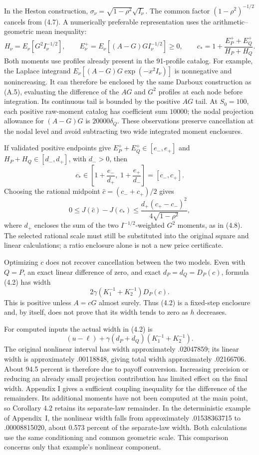 In the Heston construction, \(\sigma_\nu=\sqrt{1-\rho^2}\sqrt{I_\nu}\).
The common factor \((1-\rho^2)^{-1/2}\) cancels from (4.7). A numerically
preferable representation uses the arithmetic--geometric mean inequality:
\[
H_\nu=E_\nu[G^2I_\nu^{-1/2}],\qquad
E_\nu^+=E_\nu[(A-G)GI_\nu^{-1/2}]\ge0,
\qquad
c_* =1+\frac{E_P^++E_Q^+}{H_P+H_Q}.             \tag{4.8}
\]
Both moments use profiles already present in the 91-profile catalog.
For example, the Laplace integrand
\(E_\nu[(A-G)G\exp(-x^2I_\nu)]\) is nonnegative and nonincreasing.
It can therefore be enclosed by the same Darboux construction as (A.5),
evaluating the difference of the \(AG\) and \(G^2\) profiles at each
node before integration. Its continuous tail is bounded by the positive
\(AG\) tail. At \(S_0=100\), each positive raw-moment catalog has coefficient
sum \(10000\); the nodal projection allowance for \((A-G)G\) is
\(20000\delta_Q\). These observations preserve cancellation at the nodal
level and avoid subtracting two wide integrated moment enclosures.

If validated positive endpoints give
\(E_P^++E_Q^+\in[e_-,e_+]\) and \(H_P+H_Q\in[d_-,d_+]\), with
\(d_->0\), then
\[
c_*\in\left[1+\frac{e_-}{d_+},\;1+\frac{e_+}{d_-}\right]=[c_-,c_+].
\]
Choosing the rational midpoint \(\widehat c=(c_-+c_+)/2\) gives
\[
0\le J(\widehat c)-J(c_*)
\le \frac{d_+(c_+-c_-)^2}{4\sqrt{1-\rho^2}},    \tag{4.9}
\]
where \(d_+\) encloses the sum of the two \(I^{-1/2}\)-weighted
\(G^2\) moments, as in (4.8). The selected rational scale must still be
substituted into the original square and linear calculations; a ratio
enclosure alone is not a new price certificate.

Optimizing \(c\) does not recover cancellation between the two models.
Even with \(Q=P\), an exact linear difference of zero, and exact
\(d_P=d_Q=D_P(c)\), formula (4.2) has width
\[
2\gamma\left(K_1^{-1}+K_2^{-1}\right)D_P(c).
\]
This is positive unless \(A=cG\) almost surely. Thus (4.2) is a fixed-step
enclosure and, by itself, does not prove that its width tends to zero as
\(h\) decreases.


For computed inputs the actual width in (4.2) is
\[
(u-\ell)+\gamma(d_P+d_Q)(K_1^{-1}+K_2^{-1}).
\tag{4.10}
\]
The original nonlinear interval has width approximately .02047859; its linear
width is approximately .00118848, giving total width approximately .02166706.
About 94.5 percent is therefore due to payoff conversion. Increasing precision
or reducing an already small projection contribution has limited effect on the final width.
Appendix I gives a sufficient coupling inequality for the difference of the
remainders. Its additional moments have not been computed at the main point,
so Corollary 4.2 retains its separate-law remainder. In the deterministic example
of Appendix~I, the nonlinear width falls from approximately .01538363715 to
.00008815020, about 0.573 percent of the separate-law width. Both calculations
use the same conditioning and common geometric scale. This comparison concerns
only that example's nonlinear component.

